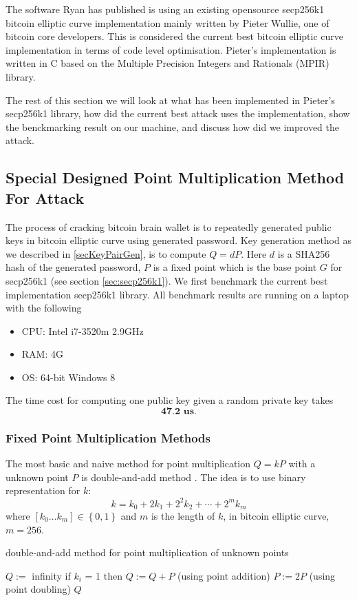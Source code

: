 The software Ryan has published is using an existing opensource secp256k1 bitcoin elliptic curve implementation mainly written by Pieter Wullie, one of bitcoin core developers. This is considered the current best bitcoin elliptic curve implementation in terms of code level optimisation. Pieter's implementation is written in C based on the Multiple Precision Integers and Rationals (MPIR) library. 

The rest of this section we will look at what has been implemented in Pieter's secp256k1 library, how did the current best attack uses the implementation, show the benckmarking result on our machine, and discuss how did we improved the attack.

\subsection{Special Designed Point Multiplication Method For Attack} \label {sec:specialMethod}
The process of cracking bitcoin brain wallet is to repeatedly generated public keys in bitcoin elliptic curve using generated password. Key generation method as we described in \ref{secKeyPairGen}, is to compute $Q = dP$. Here $d$ is a SHA256 hash of the generated password, $P$ is a fixed point which is the base point $G$ for secp256k1 (see section \ref{sec:secp256k1}). We first benchmark the current best implementation secp256k1 library. All benchmark results are running on a laptop with the following 

\begin{itemize}
	\item CPU: Intel i7-3520m 2.9GHz
	\item RAM: 4G
	\item OS: 64-bit Windows 8
\end{itemize}
The time cost for computing one public key given a random private key takes 
$$\textbf{47.2 us}. $$

\subsubsection{Fixed Point Multiplication Methods}
The most basic and naive method for point multiplication $Q=kP$ with a unknown point $P$ is double-and-add method \cite{hankerson2006guide}.  The idea is to use binary representation for $k$:
$$ k = k_0 + 2k_1 + 2^2k_2+\cdots+2^mk_m$$
where $[k_0\dots k_m]\in \left\lbrace 0,1 \right\rbrace  $ and $m$ is the length of $k$, in bitcoin elliptic curve, $m = 256$. 

 \begin{algorithm}[H] 
 	\caption{double-and-add method for point multiplication of unknown points\cite{hankerson2006guide}}
 	\label{alg:double-and-add}
 	\begin{algorithmic} [1]
 		\STATE $Q := $ infinity
 		\STATE if $k_i$ = 1 then $Q := Q+P$  (using point addition)
 		\STATE $P:= 2P$ (using point doubling)
 		\ENDFOR
 		\RETURN $Q$
 	\end{algorithmic}
 \end{algorithm}

